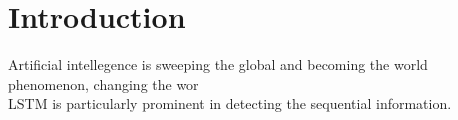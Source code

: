 \section{Introduction}
Artificial intellegence is sweeping the global and becoming the world phenomenon, changing the wor
\\
LSTM is particularly prominent in detecting the sequential information. 
